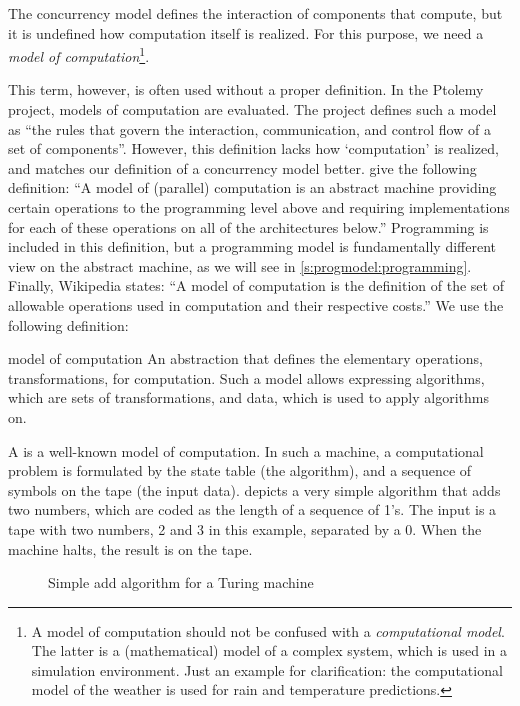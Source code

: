 The concurrency model defines the interaction of components that compute, but it is undefined how computation itself is realized.
For this purpose, we need a \emph{model of computation}\footnote{%
	A model of computation should not be confused with a \emph{computational model}.
	The latter is a (mathematical) model of a complex system, which is used in a simulation environment.
	Just an example for clarification: the computational model of the weather is used for rain and temperature predictions.
}.

This term, however, is often used without a proper definition.
In the Ptolemy~~\cite{ptolemy2} project, models of computation are evaluated.
The project defines such a model as ``the rules that govern the interaction, communication, and control flow of a set of components''.
However, this definition lacks how `computation' is realized, and matches our definition of a concurrency model better.
 give the following definition: ``A model of (parallel) computation is an abstract machine providing certain operations to the programming level above and requiring implementations for each of these operations on all of the architectures below.''
Programming is included in this definition, but a programming model is fundamentally different view on the abstract machine, as we will see in \cref{s:progmodel:programming}.
Finally, Wikipedia states: ``A model of computation is the definition of the set of allowable operations used in computation and their respective costs.''
We use the following definition:
\begin{describe}{model of computation}
	An abstraction that defines the elementary operations, \ie transformations, for computation.
	Such a model allows expressing algorithms, which are sets of transformations, and data, which is used to apply algorithms on.
\end{describe}

A  is a well-known model of computation.
In such a machine, a computational problem is formulated by the state table (the algorithm), and a sequence of symbols on the tape (the input data).
 depicts a very simple algorithm that adds two numbers, which are coded as the length of a sequence of 1's.
The input is a tape with two numbers, 2 and 3 in this example, separated by a 0.
When the machine halts, the result is on the tape.

\begin{figure}%
%
\caption{Simple add algorithm for a Turing machine}%
\label{fig:progmodel:tm_adder}%
\end{figure}

